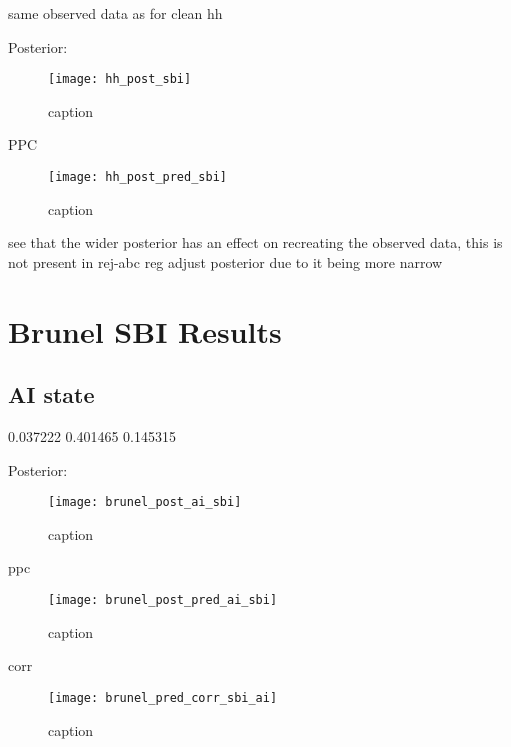 same observed data as for clean hh

Posterior:

\begin{figure}[H]
    \centering
    \texttt{[image: hh\_post\_sbi]}
    \caption{caption}
    \label{fig:fig1}
\end{figure}

PPC

\begin{figure}[H]
    \centering
    \texttt{[image: hh\_post\_pred\_sbi]}
    \caption{caption}
    \label{fig:fig1}
\end{figure}

see that the wider posterior has an effect on recreating the observed data, this is not present in rej-abc reg adjust posterior due to it being more narrow


\section{Brunel SBI Results}

\subsection{AI state} 



0.037222	0.401465	0.145315

Posterior:

\begin{figure}[H]
    \centering
    \texttt{[image: brunel\_post\_ai\_sbi]}
    \caption{caption}
    \label{fig:fig1}
\end{figure}

ppc 

\begin{figure}[H]
    \centering
    \texttt{[image: brunel\_post\_pred\_ai\_sbi]}
    \caption{caption}
    \label{fig:fig1}
\end{figure}

corr 

\begin{figure}[H]
    \centering
    \texttt{[image: brunel\_pred\_corr\_sbi\_ai]}
    \caption{caption}
    \label{fig:fig1}
\end{figure}

